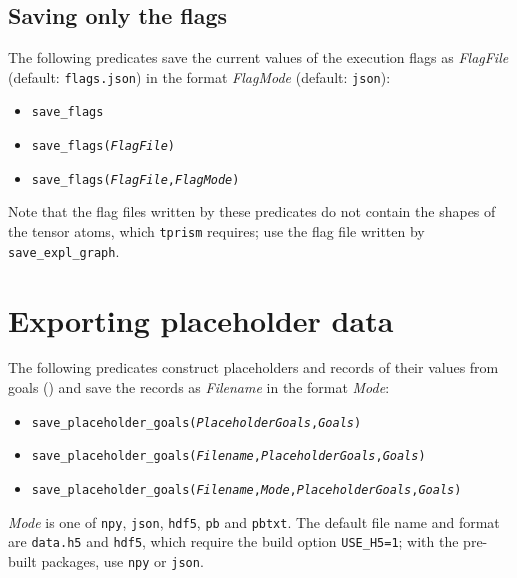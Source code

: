 \documentclass[a4paper]{report}
\begin{document}
\subsection*{Saving only the flags}
The following predicates save the current values of the execution flags
as {\it FlagFile} (default: {\tt flags.json}) in the format {\it FlagMode}
(default: {\tt json}):
\begin{itemize}
	\item {\tt save\_flags}
	\item {\tt save\_flags({\it FlagFile})}
	\item {\tt save\_flags({\it FlagFile},{\it FlagMode})}
\end{itemize}
Note that the flag files written by these predicates do not contain the
shapes of the tensor atoms, which {\tt tprism} requires; use the flag file
written by {\tt save\_expl\_graph}.

\section{Exporting placeholder data}
\label{sec:save_placeholder}

The following predicates construct placeholders and records of their
values from goals () and save the records as
{\it Filename} in the format {\it Mode}:
\begin{itemize}
	\item {\tt save\_placeholder\_goals({\it PlaceholderGoals},{\it Goals})}
	\item {\tt save\_placeholder\_goals({\it Filename},{\it PlaceholderGoals},{\it Goals})}
	\item {\tt save\_placeholder\_goals({\it Filename},{\it Mode},{\it PlaceholderGoals},{\it Goals})}
\end{itemize}
{\it Mode} is one of {\tt npy}, {\tt json}, {\tt hdf5}, {\tt pb} and {\tt pbtxt}.
The default file name and format are {\tt data.h5} and {\tt hdf5}, which
require the build option {\tt USE\_H5=1}; with the pre-built packages, use
{\tt npy} or {\tt json}.
\end{document}
